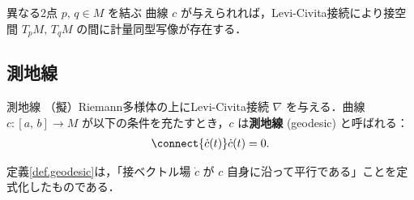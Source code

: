 \documentclass[geometry_main]{subfiles}
\begin{document}
\begin{tcolorbox} 
	異なる2点 $p,\, q \in M$ を結ぶ \cinfty 曲線 $c$ が与えられれば，Levi-Civita接続により接空間 $T_p M,\, T_qM$ の間に計量同型写像が存在する．
\end{tcolorbox}


\subsection{測地線}

\begin{mydef}[label=def.geodesic]{測地線} 
	（擬）Riemann多様体の上にLevi-Civita接続 $\nabla$ を与える．\cinfty 曲線 $c \colon [a,\, b] \to M$ が以下の条件を充たすとき，$c$ は\textbf{測地線} (geodesic) と呼ばれる：
	\begin{align} 
		\connect{\dot{c}(t)} \dot{c}(t) = 0.
	\end{align}
\end{mydef}

定義\ref{def.geodesic}は，「接ベクトル場 $\dot{c}$ が $c$ 自身に沿って平行である」ことを定式化したものである．






\end{document}
